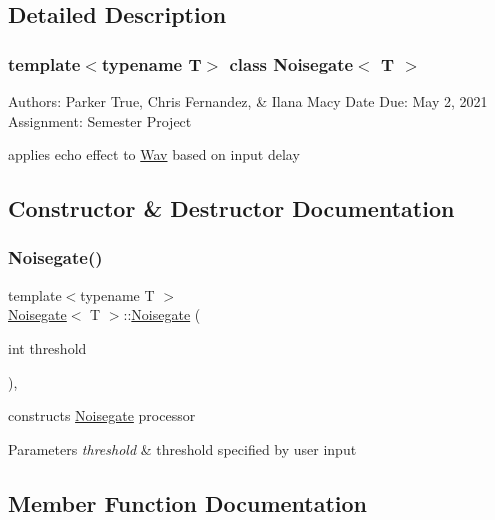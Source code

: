 \subsection{Detailed Description}
\subsubsection*{template$<$typename T$>$\newline
class Noisegate$<$ T $>$}

Authors\+: Parker True, Chris Fernandez, \& Ilana Macy Date Due\+: May 2, 2021 Assignment\+: Semester Project

applies echo effect to \hyperlink{classWav}{Wav} based on input delay 

\subsection{Constructor \& Destructor Documentation}
\mbox{\label{classNoisegate_a267d2fcf1167db41c925983401af2e6f}} 
\subsubsection{\texorpdfstring{Noisegate()}{Noisegate()}}
{\footnotesize\ttfamily template$<$typename T $>$ \\
\hyperlink{classNoisegate}{Noisegate}$<$ T $>$\+::\hyperlink{classNoisegate}{Noisegate} (\begin{DoxyParamCaption}\item[{int}]{threshold }\end{DoxyParamCaption})\hspace{0.3cm}{\ttfamily [inline]}, {\ttfamily [explicit]}}

constructs \hyperlink{classNoisegate}{Noisegate} processor 
\begin{DoxyParams}{Parameters}
{\em threshold} & threshold specified by user input \\
\hline
\end{DoxyParams}


\subsection{Member Function Documentation}
\mbox{\label{classNoisegate_a4ab84c99ea64beb3015134756a358eb9}} 
